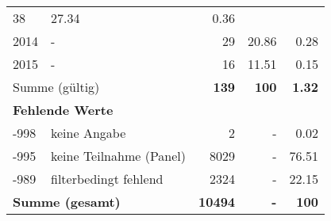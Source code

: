 \begin{longtable}{lXrrr}
       \num{38} &
       \num[round-mode=places,round-precision=2]{27,34} &
         \num[round-mode=places,round-precision=2]{0,36} \\

     2014 &
     \multicolumn{1}{X}{ -  } &


       \num{29} &
       \num[round-mode=places,round-precision=2]{20,86} &
         \num[round-mode=places,round-precision=2]{0,28} \\

     2015 &
     \multicolumn{1}{X}{ -  } &


       \num{16} &
       \num[round-mode=places,round-precision=2]{11,51} &
         \num[round-mode=places,round-precision=2]{0,15} \\
     \midrule
     \multicolumn{2}{l}{Summe (gültig)} &
       \textbf{\num{139}} &
     \textbf{100} &
       \textbf{\num[round-mode=places,round-precision=2]{1,32}} \\
     \multicolumn{5}{l}{\textbf{Fehlende Werte}}\\
       -998 &
       keine Angabe &
         \num{2} &
        - &
         \num[round-mode=places,round-precision=2]{0,02} \\
       -995 &
       keine Teilnahme (Panel) &
         \num{8029} &
        - &
         \num[round-mode=places,round-precision=2]{76,51} \\
       -989 &
       filterbedingt fehlend &
         \num{2324} &
        - &
         \num[round-mode=places,round-precision=2]{22,15} \\
     \midrule
     \multicolumn{2}{l}{\textbf{Summe (gesamt)}} &
          \textbf{\num{10494}} &
        \textbf{-} &
        \textbf{100} \\
     \bottomrule
     \end{longtable}
     
